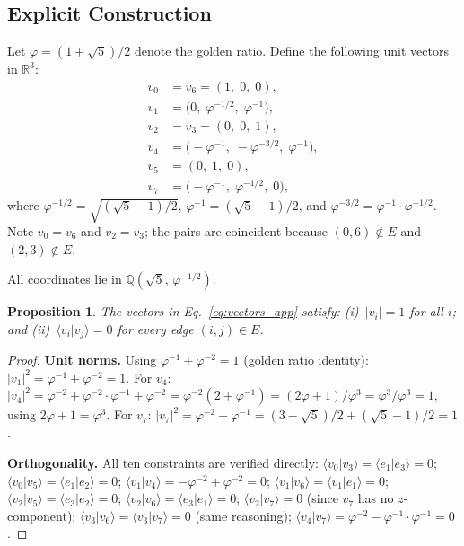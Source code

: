 \documentclass[aps,pra,twocolumn,superscriptaddress,longbibliography,floatfix]{revtex4-2}
\newtheorem{proposition}[theorem]{Proposition}
\begin{document}
\subsection{Explicit Construction}

Let $\varphi=(1+\sqrt{5})/2$ denote the golden ratio.
Define the following unit vectors in $\mathbb{R}^3$:
\begin{equation}
\begin{aligned}
  v_0 &= v_6 = (1,\;0,\;0),\\
  v_1 &= \bigl(0,\;\varphi^{-1/2},\;\varphi^{-1}\bigr),\\
  v_2 &= v_3 = (0,\;0,\;1),\\
  v_4 &= \bigl(-\varphi^{-1},\;-\varphi^{-3/2},\;\varphi^{-1}\bigr),\\
  v_5 &= (0,\;1,\;0),\\
  v_7 &= \bigl(-\varphi^{-1},\;\varphi^{-1/2},\;0\bigr),
\end{aligned}
\label{eq:vectors_app}
\end{equation}
where $\varphi^{-1/2}=\sqrt{(\sqrt{5}-1)/2}$, $\varphi^{-1}=(\sqrt{5}-1)/2$,
and $\varphi^{-3/2}=\varphi^{-1}\cdot\varphi^{-1/2}$.
Note $v_0=v_6$ and $v_2=v_3$; the pairs are coincident because $(0,6)\notin E$
and $(2,3)\notin E$.

All coordinates lie in $\mathbb{Q}(\sqrt{5},\,\varphi^{-1/2})$.

\begin{proposition}
\label{prop:construction}
The vectors in Eq.~\eqref{eq:vectors_app} satisfy:
(i)~$|v_i|=1$ for all $i$; and
(ii)~$\langle v_i|v_j\rangle=0$ for every edge $(i,j)\in E$.
\end{proposition}

\begin{proof}
\textbf{Unit norms.}
Using $\varphi^{-1}+\varphi^{-2}=1$ (golden ratio identity):
$|v_1|^2=\varphi^{-1}+\varphi^{-2}=1$.
For $v_4$: $|v_4|^2=\varphi^{-2}+\varphi^{-2}\cdot\varphi^{-1}+\varphi^{-2}
=\varphi^{-2}(2+\varphi^{-1})=(2\varphi+1)/\varphi^3=\varphi^3/\varphi^3=1$,
using $2\varphi+1=\varphi^3$.
For $v_7$: $|v_7|^2=\varphi^{-2}+\varphi^{-1}=(3-\sqrt5)/2+(\sqrt5-1)/2=1$.

\textbf{Orthogonality.}
All ten constraints are verified directly:
$\langle v_0|v_3\rangle=\langle e_1|e_3\rangle=0$;
$\langle v_0|v_5\rangle=\langle e_1|e_2\rangle=0$;
$\langle v_1|v_4\rangle=-\varphi^{-2}+\varphi^{-2}=0$;
$\langle v_1|v_6\rangle=\langle v_1|e_1\rangle=0$;
$\langle v_2|v_5\rangle=\langle e_3|e_2\rangle=0$;
$\langle v_2|v_6\rangle=\langle e_3|e_1\rangle=0$;
$\langle v_2|v_7\rangle=0$ (since $v_7$ has no $z$-component);
$\langle v_3|v_6\rangle=\langle v_3|v_7\rangle=0$ (same reasoning);
$\langle v_4|v_7\rangle=\varphi^{-2}-\varphi^{-1}\cdot\varphi^{-1}=0$.
\end{proof}
\end{document}
